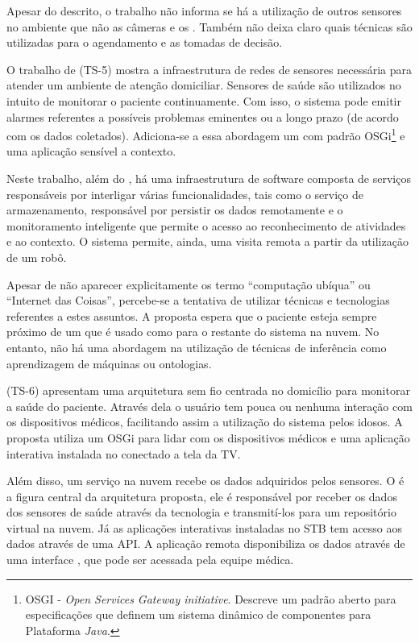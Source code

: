 Apesar do descrito, o trabalho não informa se há a utilização de outros
sensores no ambiente que não as câmeras e os \smartphones. Também não deixa
claro quais técnicas são utilizadas para o agendamento e as tomadas de decisão.

O trabalho de  (TS-5) mostra a infraestrutura de redes
de sensores necessária para atender um ambiente de atenção domiciliar.
Sensores de saúde são utilizados no intuito de monitorar o paciente
continuamente. Com isso, o sistema pode emitir alarmes referentes a possíveis
problemas eminentes ou a longo prazo (de acordo com os dados coletados).
Adiciona-se a essa abordagem um \middleware[] com padrão OSGi\footnote{OSGI -
\textit{Open Services Gateway initiative}. Descreve um padrão aberto para
especificações que definem um sistema dinâmico de componentes para Plataforma
\textit{Java}.} e uma aplicação sensível a contexto.

Neste trabalho, além do \middleware, há uma infraestrutura de software composta
de serviços responsáveis por interligar várias funcionalidades, tais como o
serviço de armazenamento, responsável por persistir os dados remotamente e o
monitoramento inteligente que permite o acesso ao reconhecimento de atividades
e ao contexto. O sistema permite, ainda, uma visita remota a partir da
utilização de um robô.

Apesar de não aparecer explicitamente os termo ``computação ubíqua'' ou ``Internet
das Coisas'', percebe-se a tentativa de utilizar técnicas e tecnologias referentes a
estes assuntos. A proposta espera que o paciente esteja sempre próximo
de um \smartphone[] que é usado como \gateway[] para o restante do sistema na nuvem.
No entanto, não há uma abordagem na utilização de técnicas de inferência como
aprendizagem de máquinas ou ontologias.

 (TS-6) apresentam uma arquitetura sem fio centrada no
domicílio para monitorar a saúde do paciente. Através dela o usuário tem pouca
ou nenhuma interação com os dispositivos médicos, facilitando assim a
utilização do sistema pelos idosos. A proposta utiliza um \framework[] OSGi para
lidar com os dispositivos médicos e uma aplicação interativa instalada no
\stb[] conectado a tela da TV. 

Além disso, um serviço na nuvem recebe os dados adquiridos pelos sensores. O
\gateway[] é a figura central da arquitetura proposta, ele é responsável por
receber os dados dos sensores de saúde através da tecnologia \bluetooth[] e
transmití-los para um repositório virtual na nuvem.  Já as aplicações
interativas instaladas no STB tem acesso aos dados através de uma API. A
aplicação remota disponibiliza os dados através de uma interface \web, que pode
ser acessada pela equipe médica.

